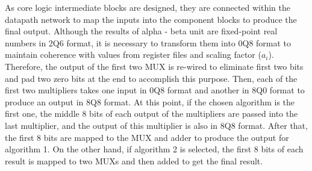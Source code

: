 \documentclass[letterpaper, 11pt]{article}
\begin{document}
	As core logic intermediate blocks are designed, they are connected within the datapath network to map the inputs into the component blocks to produce the final output. Although the results of alpha - beta unit are fixed-point real numbers in 2Q6 format, it is necessary to transform them into 0Q8 format to maintain coherence with values from register files and scaling factor ($a_i$). Therefore, the output of the first two MUX is re-wired to eliminate first two bits and pad two zero bits at the end to accomplish this purpose. Then, each of the first two multipliers takes one input in 0Q8 format and another in 8Q0 format to produce an output in 8Q8 format. At this point, if the chosen algorithm is the first one, the middle 8 bits of each output of the multipliers are passed into the last multiplier, and the output of this multiplier is also in 8Q8 format. After that, the first 8 bits are mapped to the MUX and adder to produce the output for algorithm 1. On the other hand, if algorithm 2 is selected, the first 8 bits of each result is mapped to two MUXs and then added to get the final result.
	
\end{document}
